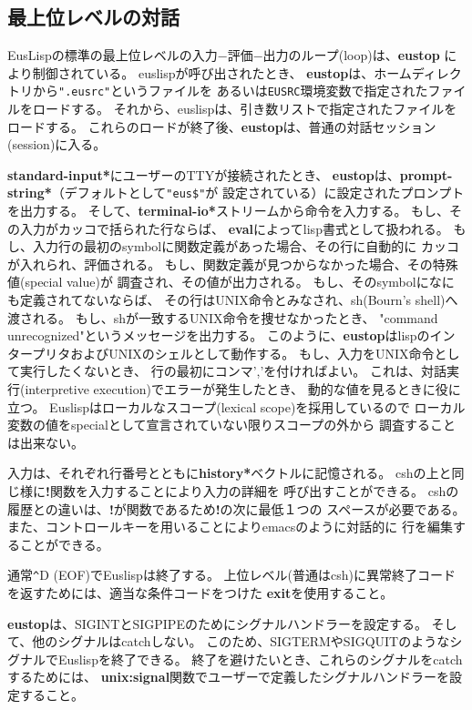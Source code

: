 \newpage

\subsection{最上位レベルの対話}

EusLispの標準の最上位レベルの入力−評価−出力のループ(loop)は、{\bf eustop}
により制御されている。
euslispが呼び出されたとき、
{\bf eustop}は、ホームディレクトリから{\tt ".eusrc"}というファイルを
あるいは{\tt EUSRC}環境変数で指定されたファイルをロードする。
それから、euslispは、引き数リストで指定されたファイルをロードする。
これらのロードが終了後、{\bf eustop}は、普通の対話セッション(session)に入る。

{\bf *standard-input*}にユーザーのTTYが接続されたとき、
{\bf eustop}は、{\bf *prompt-string*}（デフォルトとして{\tt "eus\$"}が
設定されている）に設定されたプロンプトを出力する。
そして、{\bf *terminal-io*}ストリームから命令を入力する。
もし、その入力がカッコで括られた行ならば、
{\bf eval}によってlisp書式として扱われる。
もし、入力行の最初のsymbolに関数定義があった場合、その行に自動的に
カッコが入れられ、評価される。
もし、関数定義が見つからなかった場合、その特殊値(special value)が
調査され、その値が出力される。
もし、そのsymbolになにも定義されてないならば、
その行はUNIX命令とみなされ、sh(Bourn's shell)へ渡される。
もし、shが一致するUNIX命令を捜せなかったとき、
"command unrecognized"というメッセージを出力する。
このように、{\bf eustop}はlispのインタープリタおよびUNIXのシェルとして動作する。
もし、入力をUNIX命令として実行したくないとき、
行の最初にコンマ','を付ければよい。
これは、対話実行(interpretive execution)でエラーが発生したとき、
動的な値を見るときに役に立つ。
Euslispはローカルなスコープ(lexical scope)を採用しているので
ローカル変数の値をspecialとして宣言されていない限りスコープの外から
調査することは出来ない。

入力は、それぞれ行番号とともに{\bf *history*}ベクトルに記憶される。
cshの上と同じ様に{\bf !}関数を入力することにより入力の詳細を
呼び出すことができる。
cshの履歴との違いは、{\bf !}が関数であるため{\bf !}の次に最低１つの
スペースが必要である。
また、コントロールキーを用いることによりemacsのように対話的に
行を編集することができる。

通常\verb+^+D (EOF)でEuslispは終了する。
上位レベル(普通はcsh)に異常終了コードを返すためには、適当な条件コードをつけた
{\bf exit}を使用すること。

{\bf eustop}は、SIGINTとSIGPIPEのためにシグナルハンドラーを設定する。
そして、他のシグナルはcatchしない。
このため、SIGTERMやSIGQUITのようなシグナルでEuslispを終了できる。
終了を避けたいとき、これらのシグナルをcatchするためには、
{\bf unix:signal}関数でユーザーで定義したシグナルハンドラーを設定すること。


